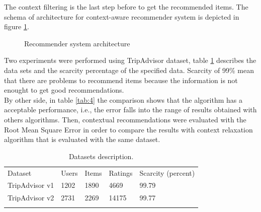 The context filtering is the last step before to get the recommended
items. The schema of architecture for context-aware recommender system
is depicted in figure \ref{fig:architecture}.
\begin{figure}
\captionsetup{font=footnotesize}
\captionsetup{justification=centering,margin=2cm}
\centering
{}
\caption{Recommender system architecture}
\label{fig:architecture}   
\end{figure}
Two experiments were performed using TripAdvisor dataset, table
\ref{tab:3} describes the data sets and the scarcity percentage of the
specified data. Scarcity of 99\% mean that there are problems to
recommend items because the information is not enought to get 
good recommendations.\\  By other side, in table \ref{tab:4} the comparison
shows that the algorithm has a acceptable performance, i.e., the error
falls into the range of results obtained with others algorithms. Then,
contextual recommendations were evaluated with the Root Mean Square
Error in order to compare the results with context relaxation
algorithm\cite{zheng2012differential} that is evaluated with the same
dataset.
\begin{table}
\centering
\small
\captionsetup{font=footnotesize}
\caption{Datasets description.}
\label{tab:3}      
\begin{tabular}{lllll}
\hline\noalign{\smallskip}
Dataset & Users & Items & Ratings & Scarcity (percent) \\
\noalign{\smallskip}\hline\noalign{\smallskip}
TripAdvisor v1 & 1202 & 1890 & 4669 & 99.79 \\
TripAdvisor v2 & 2731 & 2269 & 14175 & 99.77 \\
\noalign{\smallskip}\hline
\end{tabular}
\end{table}

